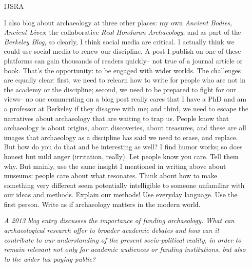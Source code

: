 \begin{labeling}{IJSRA}
\item[RAJ] I also blog about archaeology at three other places: my own \textit{Ancient Bodies, Ancient Lives}; the collaborative \textit{Real Honduran Archaeology}; and as part of the \textit{Berkeley Blog}, so clearly, I think social media are critical. I actually think we could use social media to renew our discipline. A post I publish on one of these platforms can gain thousands of readers quickly-- not true of a journal article or book. That's the opportunity: to be engaged with wider worlds. The challenges are equally clear: first, we need to relearn how to write for people who are not in the academy or the discipline; second, we need to be prepared to fight for our views-- no one commenting on a blog post really cares that I have a PhD and am a professor at Berkeley if they disagree with me; and third, we need to escape the narratives about archaeology that are waiting to trap us. People know that archaeology is about origins, about discoveries, about treasures, and these are all images that archaeology as a discipline has said we need to erase, and replace. But how do you do that and be interesting as well? I find humor works; so does honest but mild anger (irritation, really). Let people know you care. Tell them why. But mainly, use the same insight I mentioned in writing above about museums: people care about what resonates. Think about how to make something very different seem potentially intelligible to someone unfamiliar with our ideas and methods. Explain our methods! Use everyday language. Use the first person. Write as if archaeology matters in the modern world. 
	
\item[IJSRA] \textit{A 2013 blog entry discusses the importance of funding archaeology. What can archaeological research offer to broader academic debates and how can it contribute to our understanding of the present socio-political reality, in order to remain relevant not only for academic audiences or funding institutions, but also to the wider tax-paying public?}


\end{labeling}
